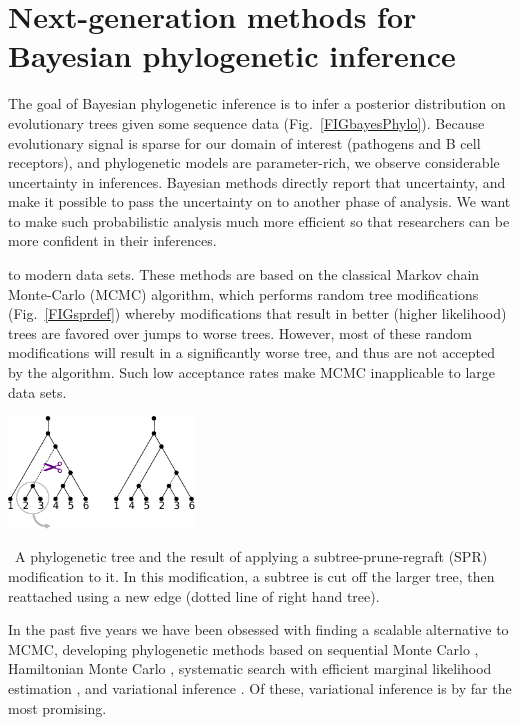 \documentclass[nobib]{tufte-handout}
\begin{document}
\section{Next-generation methods for Bayesian phylogenetic inference}
\vspace{-0.3cm}
The goal of Bayesian phylogenetic inference is to infer a posterior distribution on evolutionary trees given some sequence data (Fig.~\ref{FIGbayesPhylo}).
Because evolutionary signal is sparse for our domain of interest (pathogens and B cell receptors), and phylogenetic models are parameter-rich, we observe considerable uncertainty in inferences.
Bayesian methods directly report that uncertainty, and make it possible to pass the uncertainty on to another phase of analysis.
We want to make such probabilistic analysis much more efficient so that researchers can be more confident in their inferences.

 to modern data sets.
These methods are based on the classical Markov chain Monte-Carlo (MCMC) algorithm, which performs random tree modifications (Fig.~\ref{FIGsprdef}) whereby modifications that result in better (higher likelihood) trees are favored over jumps to worse trees.
However, most of these random modifications will result in a significantly worse tree, and thus are not accepted by the algorithm.
Such low acceptance rates make MCMC inapplicable to large data sets.

\begin{marginfigure}[-1.9in]%
  \includegraphics[width=1.95in]{spr-definition}
  \caption{\
    A phylogenetic tree and the result of applying a subtree-prune-regraft (SPR) modification to it.
    In this modification, a subtree is cut off the larger tree, then reattached using a new edge (dotted line of right hand tree).
    }
  \label{FIGsprdef}
\end{marginfigure}%

In the past five years we have been obsessed with finding a scalable alternative to MCMC, developing phylogenetic methods based on
sequential Monte Carlo \cite{Dinh2017-sh,Fourment2017-an,Claywell2018-zg},
Hamiltonian Monte Carlo \cite{Dinh2017-oj},
systematic search \cite{Whidden2018-db} with efficient marginal likelihood estimation \cite{Fourment2018-xx},
and variational inference \cite{Zhang2018-lw,Zhang2018-mm}.
Of these, variational inference is by far the most promising.
\end{document}
